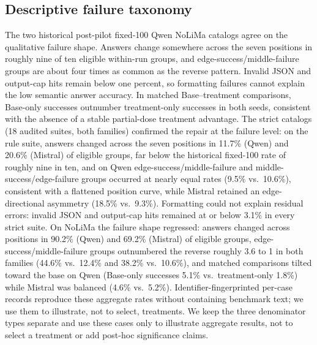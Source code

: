 \documentclass[11pt]{article}
\begin{document}
\begin{table}[t]
\centering
\small
\caption{Representative-seed NoLiMa mechanism decomposition. Locate-only requests the quote; oracle-long moves gold evidence to a tagged block after the same long distractor context; oracle-short removes distractors. Values are clustered over the 10 semantic cases.}
\label{tab:mechanism}
\end{table}

\subsection{Descriptive failure taxonomy}

The two historical post-pilot fixed-100 Qwen NoLiMa catalogs agree on the qualitative failure shape. Answers change somewhere across the seven positions in roughly nine of ten eligible within-run groups, and edge-success/middle-failure groups are about four times as common as the reverse pattern. Invalid JSON and output-cap hits remain below one percent, so formatting failures cannot explain the low semantic answer accuracy. In matched Base--treatment comparisons, Base-only successes outnumber treatment-only successes in both seeds, consistent with the absence of a stable partial-dose treatment advantage. The strict catalogs (18 audited suites, both families) confirmed the repair at the failure level: on the rule suite, answers changed across the seven positions in 11.7\% (Qwen) and 20.6\% (Mistral) of eligible groups, far below the historical fixed-100 rate of roughly nine in ten, and on Qwen edge-success/middle-failure and middle-success/edge-failure groups occurred at nearly equal rates (9.5\% vs.\ 10.6\%), consistent with a flattened position curve, while Mistral retained an edge-directional asymmetry (18.5\% vs.\ 9.3\%). Formatting could not explain residual errors: invalid JSON and output-cap hits remained at or below 3.1\% in every strict suite. On NoLiMa the failure shape regressed: answers changed across positions in 90.2\% (Qwen) and 69.2\% (Mistral) of eligible groups, edge-success/middle-failure groups outnumbered the reverse roughly 3.6 to 1 in both families (44.6\% vs.\ 12.4\% and 38.2\% vs.\ 10.6\%), and matched comparisons tilted toward the base on Qwen (Base-only successes 5.1\% vs.\ treatment-only 1.8\%) while Mistral was balanced (4.6\% vs.\ 5.2\%). Identifier-fingerprinted per-case records reproduce these aggregate rates without containing benchmark text; we use them to illustrate, not to select, treatments. We keep the three denominator types separate and use these cases only to illustrate aggregate results, not to select a treatment or add post-hoc significance claims.
\end{document}
